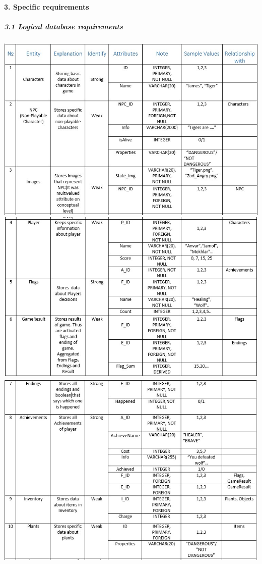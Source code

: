 \documentclass[12pt,a4paper]{article}
\begin{document}
\paragraph{3. Specific requirements\\}
\subparagraph{3.1 Logical database requirements\\}
\begin{center}

\includegraphics[scale=0.6]{images/LDR1.jpg}
\includegraphics[scale=0.6]{images/LDR2.jpg} 
\includegraphics[scale=0.6]{images/LDR3.jpg}

\end{center}
\end{document}
